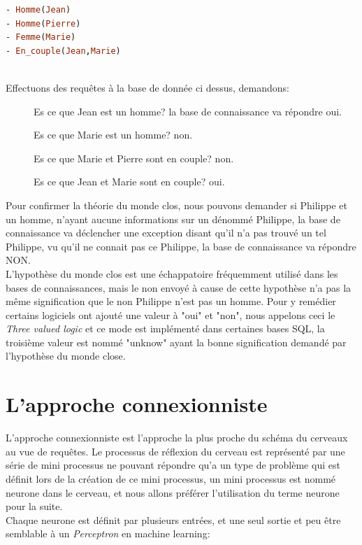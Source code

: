\linebreak
\lstset{style=mlpythoncode}
\begin{lstlisting}[language=Prolog]
- Homme(Jean)
- Homme(Pierre)
- Femme(Marie)
- En_couple(Jean,Marie)
\end{lstlisting}
\ \\
Effectuons des requêtes à la base de donnée ci dessus, demandons:
\begin{description}
\item[] Es ce que Jean est un homme? la base de connaissance va répondre oui.
\item[] Es ce que Marie est un homme? non.
\item[] Es ce que Marie et Pierre sont en couple? non.
\item[] Es ce que Jean et Marie sont en couple? oui.
\end{description}

Pour confirmer la théorie du monde clos, nous pouvons demander si Philippe et un homme, n'ayant aucune informations sur un dénommé Philippe, la base de connaissance va déclencher une exception disant qu'il n'a pas trouvé un tel Philippe, vu qu'il ne connait pas ce Philippe, la base de connaissance va répondre NON.\\ 
\linebreak L'hypothèse du monde clos est une échappatoire fréquemment utilisé dans les bases de connaissances, mais le non envoyé à cause de cette hypothèse n'a pas la même signification que le non Philippe n'est pas un homme. Pour y remédier certains logiciels ont ajouté une valeur à "oui" et "non", nous appelons ceci le \textit{Three valued logic} et ce mode est implémenté dans certaines bases SQL, la troisième valeur est nommé "unknow" ayant la bonne signification demandé par l'hypothèse du monde close.

\pagebreak
\section{L'approche connexionniste}
L'approche connexionniste est l'approche la plus proche du schéma du cerveaux au vue de requêtes. Le processus de réflexion du cerveau est représenté par une série de mini processus ne pouvant répondre qu'a un type de problème qui est définit lors de la création de ce mini processus, un mini processus est nommé neurone dans le cerveau, et nous allons préférer l'utilisation du terme neurone pour la suite. \\
Chaque neurone est définit par plusieurs entrées, et une seul sortie et peu être semblable à un \textit{Perceptron} en machine learning:


